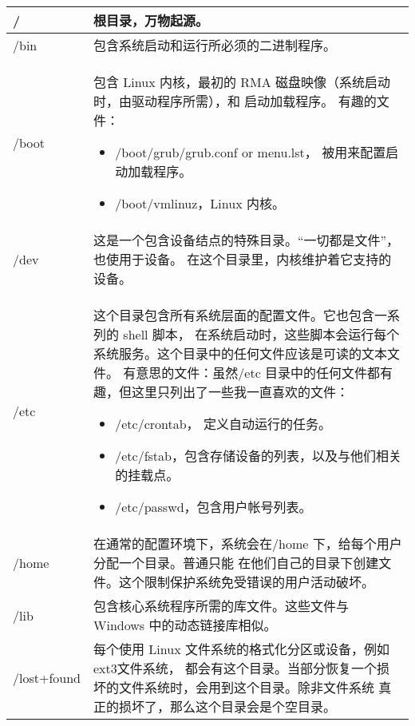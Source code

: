 \begin{center} 
\tablelasttail{\bottomrule}

\begin{supertabular}{p{2.cm}p{13cm}}

/	& 根目录，万物起源。\\
\midrule
/bin & 包含系统启动和运行所必须的二进制程序。\\
\midrule
/boot & 
包含 Linux 内核，最初的 RMA 磁盘映像（系统启动时，由驱动程序所需），和 启动加载程序。
有趣的文件：
\begin{itemize} 
	\item  /boot/grub/grub.conf or menu.lst， 被用来配置启动加载程序。
	\item /boot/vmlinuz，Linux 内核。
\end{itemize} \\
\midrule
/dev & 这是一个包含设备结点的特殊目录。“一切都是文件”，也使用于设备。 在这个目录里，内核维护着它支持的设备。\\
\midrule /etc & 	
这个目录包含所有系统层面的配置文件。它也包含一系列的 shell 脚本， 在系统启动时，这些脚本会运行每个系统服务。这个目录中的任何文件应该是可读的文本文件。
有意思的文件：虽然/etc 目录中的任何文件都有趣，但这里只列出了一些我一直喜欢的文件：
\begin{itemize}
	\item /etc/crontab， 定义自动运行的任务。
	\item /etc/fstab，包含存储设备的列表，以及与他们相关的挂载点。
	\item /etc/passwd，包含用户帐号列表。
\end{itemize} \\
\midrule /home & 在通常的配置环境下，系统会在/home 下，给每个用户分配一个目录。普通只能 在他们自己的目录下创建文件。这个限制保护系统免受错误的用户活动破坏。\\
\midrule /lib & 包含核心系统程序所需的库文件。这些文件与 Windows 中的动态链接库相似。 \\
\midrule/lost+found	& 每个使用 Linux 文件系统的格式化分区或设备，例如 ext3文件系统， 都会有这个目录。当部分恢复一个损坏的文件系统时，会用到这个目录。除非文件系统 真正的损坏了，那么这个目录会是个空目录。 \\

\end{supertabular}
\end{center}
